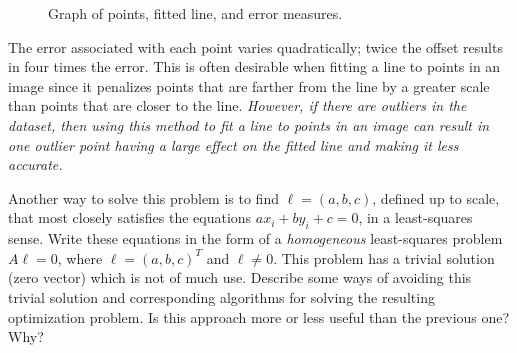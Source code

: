 \begin{problem}
\begin{enumroman}
\begin{answer}
\begin{figure}[H]
          \caption{Graph of points, fitted line, and error measures.}
        \end{figure}

        The error associated with each point varies quadratically;
        twice the offset results in four times the error.
        This is often desirable when fitting a line to points in an image
        since it penalizes points that are farther from the line by a
        greater scale than points that are closer to the line.
        \emph{
          However, if there are outliers in the dataset,
          then using this method to fit a line to points in an image
          can result in one outlier point having a large effect on the
          fitted line and making it less accurate.
        } \\
      \end{answer}

    \newpage
    \item Another way to solve this problem is to find
      $\ell = (a, b, c)$, defined up to scale, that
      most closely satisfies the equations $ax_i + by_i + c = 0$,
      in a least-squares sense.
      Write these equations in the form of a \emph{homogeneous}
      least-squares problem $A \ell = 0$, where $\ell = (a, b, c)^T$
      and $\ell \ne 0$.
      This problem has a trivial solution (zero vector) which is not
      of much use. Describe some ways of avoiding this trivial solution
      and corresponding algorithms for solving the resulting
      optimization problem. Is this approach more or less
      useful than the previous one? Why?
      

\end{enumroman}
\end{problem}
